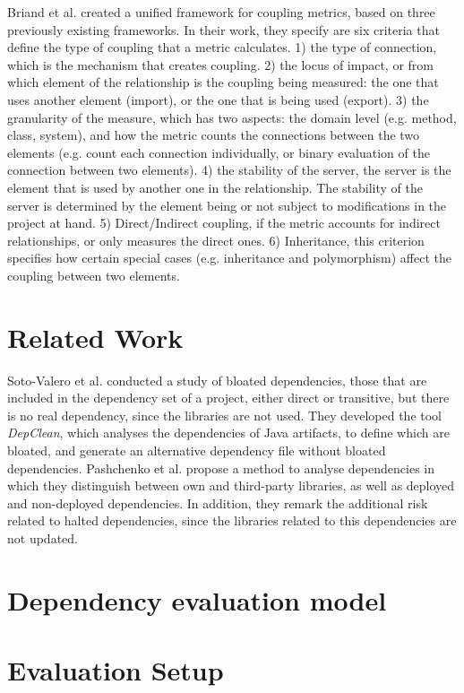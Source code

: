 \documentclass[a4paper]{article}
\begin{document}
Briand et al. \cite{briand1999unified} created a unified framework for coupling metrics, based on three previously existing frameworks. In their work, they specify are six criteria that define the type of coupling that a metric calculates. 1) the type of connection, which is the mechanism that creates coupling. 2) the locus of impact, or from which element of the relationship is the coupling being measured: the one that uses another element (import), or the one that is being used (export). 3) the granularity of the measure, which has two aspects: the domain level (e.g. method, class, system), and how the metric counts the connections between the two elements (e.g. count each connection individually, or binary evaluation of the connection between two elements). 4) the stability of the server, the server is the element that is used by another one in the relationship. The stability of the server is determined by the element being or not subject to modifications in the project at hand. 5) Direct/Indirect coupling, if the metric accounts for indirect relationships, or only measures the direct ones. 6) Inheritance, this criterion specifies how certain special cases (e.g. inheritance and polymorphism) affect the coupling between two elements.

\section{Related Work}
Soto-Valero et al. \cite{soto2020comprehensive} conducted a study of bloated dependencies, those that are included in the dependency set of a project, either direct or transitive, but there is no real dependency, since the libraries are not used. They developed the tool \textit{DepClean}, which analyses the dependencies of Java artifacts, to define which are bloated, and generate an alternative dependency file without bloated dependencies. Pashchenko et al. \cite{pashchenko2018vulnerable} propose a method to analyse dependencies in which they distinguish between own and third-party libraries, as well as deployed and non-deployed dependencies. In addition, they remark the additional risk related to halted dependencies, since the libraries related to this dependencies are not updated.

\section{Dependency evaluation model}



\section{Evaluation Setup}
\end{document}
